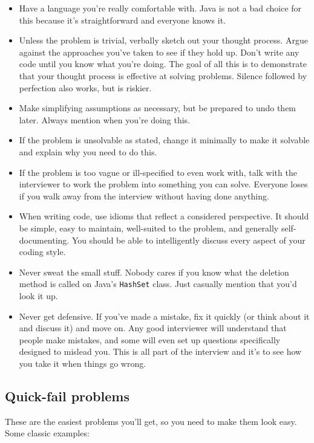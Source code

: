 \documentclass{article}
\begin{document}
\begin{itemize}
\item{Have a language you're really comfortable with. Java is not a bad}
  choice for this because it's straightforward and everyone knows it.

\item{Unless the problem is trivial, verbally sketch out your thought}
  process. Argue against the approaches you've taken to see if they hold
  up. Don't write any code until you know what you're doing. The goal of
  all this is to demonstrate that your thought process is effective at
  solving problems. Silence followed by perfection also works, but is
  riskier.

\item{Make simplifying assumptions as necessary, but be prepared to undo}
  them later. Always mention when you're doing this.

\item{If the problem is unsolvable as stated, change it minimally to}
  make it solvable and explain why you need to do this.

\item{If the problem is too vague or ill-specified to even work with,}
  talk with the interviewer to work the problem into something you can
  solve. Everyone loses if you walk away from the interview without
  having done anything.

\item{When writing code, use idioms that reflect a considered}
  perspective. It should be simple, easy to maintain, well-suited to the
  problem, and generally self-documenting. You should be able to
  intelligently discuss every aspect of your coding style.

\item{Never sweat the small stuff. Nobody cares if you know what the}
  deletion method is called on Java's {\tt HashSet} class. Just casually
  mention that you'd look it up.

\item{Never get defensive. If you've made a mistake, fix it quickly (or}
  think about it and discuss it) and move on. Any good interviewer will
  understand that people make mistakes, and some will even set up
  questions specifically designed to mislead you. This is all part of the
  interview and it's to see how you take it when things go wrong.
\end{itemize}

\subsection{Quick-fail problems}
    These are the easiest problems you'll get, so you need to make them look
    easy. Some classic examples:
\end{document}
